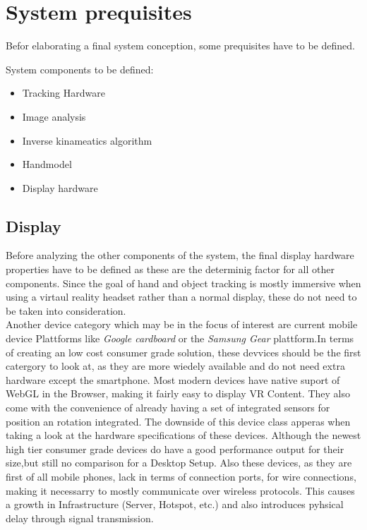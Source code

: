 \chapter{System prequisites}

Befor elaborating a final system conception, some prequisites have to be defined.

System components to be defined:
\begin{itemize}
 \item Tracking Hardware
 \item Image analysis
 \item Inverse kinameatics algorithm
 \item Handmodel
 \item Display hardware 
 \end{itemize} 

 \section{Display}
 Before analyzing the other components of the system, the final display hardware   properties have to be defined as these are the determinig factor for all other components. Since the goal of hand and object tracking is mostly immersive when using a virtaul reality headset rather than a normal display, these do not need to be taken into consideration.\\
Another device category which may be in the focus of interest are current mobile device Plattforms like \textit{Google cardboard} or the \textit{Samsung Gear} plattform.In terms of creating an low cost consumer grade solution, these devvices should be the first catergory to look at, as they are more wiedely available and do not need extra hardware except the smartphone. Most modern devices have native suport of WebGL in the Browser, making it fairly easy to display VR Content. They also come with the convenience of already having a set of integrated sensors for position an rotation integrated. The downside of this device class apperas when taking a look at the hardware specifications of these devices. Although the newest high tier consumer grade devices do have a good performance output for their size,but still no comparison for a Desktop Setup.  Also these devices, as they are first of all mobile phones, lack in terms of connection ports, for wire connections, making it necessarry to mostly communicate over wireless protocols. This causes a growth in  Infrastructure (Server, Hotspot, etc.) and also introduces pyhsical delay through signal transmission.\\
